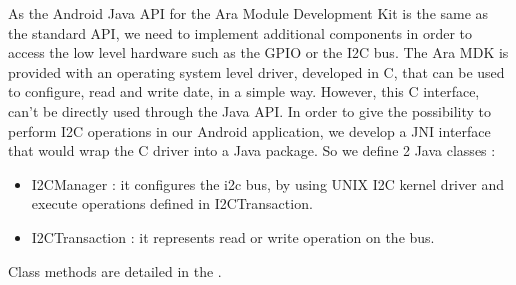 As the Android Java API for the Ara Module Development Kit is the same as the standard API, we need to implement additional components in order to access the low level hardware such as the GPIO or the I2C bus.
The Ara MDK is provided with an operating system level driver, developed in C, that can be used to configure, read and write date, in a simple way.
However, this C interface, can't be directly used through the Java API. In order to give the possibility to perform I2C operations in our Android application, we develop a JNI interface that would wrap the C driver into a Java package.
So we define 2 Java classes : 
\begin{itemize}
\item I2CManager : it configures the i2c bus, by using UNIX I2C kernel driver and execute operations defined in I2CTransaction.
\item I2CTransaction : it represents read or write operation on the bus.
\end{itemize}

Class methods are detailed in the \citep{an:e}.
